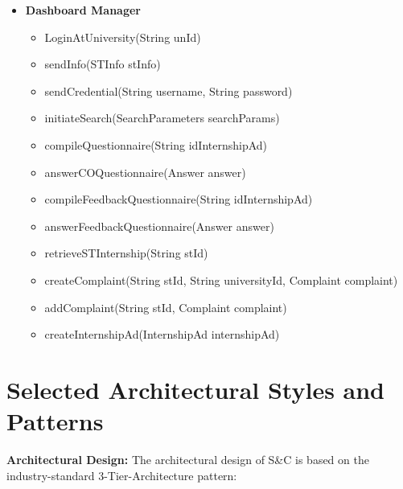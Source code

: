 \begin{itemize}
      \item \textbf{Dashboard Manager}
          \begin{itemize}
              \item LoginAtUniversity(String unId)
              \item sendInfo(STInfo stInfo)
              \item sendCredential(String username, String password)
              \item initiateSearch(SearchParameters searchParams)
              \item compileQuestionnaire(String idInternshipAd)
              \item answerCOQuestionnaire(Answer answer)
              \item compileFeedbackQuestionnaire(String idInternshipAd)
              \item answerFeedbackQuestionnaire(Answer answer)
              \item retrieveSTInternship(String stId)
              \item createComplaint(String stId, String universityId, Complaint complaint)
              \item addComplaint(String stId, Complaint complaint)
              \item createInternshipAd(InternshipAd internshipAd)
          \end{itemize}
  
  \end{itemize}


\section{Selected Architectural Styles and Patterns}
\label{sec:selected-architectural-styles-patterns}%

\par{\textbf{Architectural Design:}} The architectural design of S\&C is based on the industry-standard 3-Tier-Architecture pattern:

